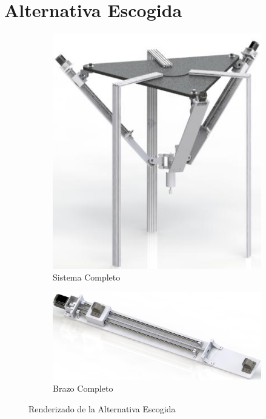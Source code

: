 \section{Alternativa Escogida}
\begin{figure}[hbt!]
    \centering
    \begin{subfigure}{0.5\textwidth}
        \includegraphics[width = \linewidth]{Cap3_DisenoConceptual/Figura/Solucion1.JPG}
        \caption{Sistema Completo}
    \end{subfigure}
    \begin{subfigure}{0.5\textwidth}
        \includegraphics[width = \linewidth]{Cap3_DisenoConceptual/Figura/Solucion2.JPG}
        \caption{Brazo Completo}
    \end{subfigure}
    \caption{Renderizado de la Alternativa Escogida}
    \label{fig:RenderSolucion}
\end{figure}
